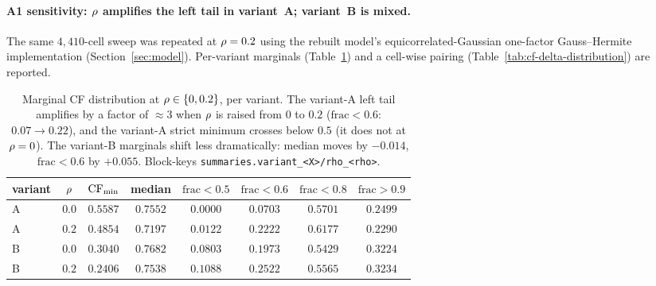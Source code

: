 \paragraph{A1 sensitivity: $\rho$ amplifies the left tail in
variant~A; variant~B is mixed.}
The same $4{,}410$-cell sweep was repeated at $\rho = 0.2$ using
the rebuilt model's equicorrelated-Gaussian one-factor
Gauss--Hermite implementation (Section~\ref{sec:model}).
Per-variant marginals (Table~\ref{tab:cf-rho-sensitivity}) and a
cell-wise pairing (Table~\ref{tab:cf-delta-distribution}) are
reported.
%
\begin{table}[t]
  \centering
  \small
  \begin{tabular}{l c c c c c c c}
    \toprule
    variant & $\rho$ & $\mathrm{CF}_{\min}$ & median &
    $\mathrm{frac}\!<\!0.5$ & $\mathrm{frac}\!<\!0.6$ &
    $\mathrm{frac}\!<\!0.8$ & $\mathrm{frac}\!>\!0.9$\\
    \midrule
    A & $0.0$ & $0.5587$ & $0.7552$
      & $0.0000$ & $0.0703$ & $0.5701$ & $0.2499$\\
    A & $0.2$ & $0.4854$ & $0.7197$
      & $0.0122$ & $\mathbf{0.2222}$ & $0.6177$ & $0.2290$\\
    \midrule
    B & $0.0$ & $0.3040$ & $0.7682$
      & $0.0803$ & $0.1973$ & $0.5429$ & $0.3224$\\
    B & $0.2$ & $0.2406$ & $0.7538$
      & $0.1088$ & $0.2522$ & $0.5565$ & $0.3234$\\
    \bottomrule
  \end{tabular}
  \caption{Marginal CF distribution at $\rho \in \{0, 0.2\}$,
  per variant. The variant-A left tail amplifies by a factor of
  $\approx 3$ when $\rho$ is raised from $0$ to $0.2$
  ($\mathrm{frac}\!<\!0.6$: $0.07 \to 0.22$), and the variant-A
  strict minimum crosses below $0.5$ (it does not at $\rho = 0$).
  The variant-B marginals shift less dramatically: median moves by
  $-0.014$, $\mathrm{frac}\!<\!0.6$ by $+0.055$. Block-keys
  \texttt{summaries.variant\_<X>/rho\_<rho>}.}
  \label{tab:cf-rho-sensitivity}
\end{table}
%
